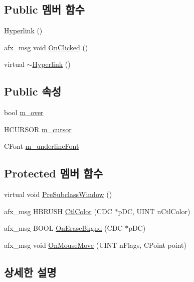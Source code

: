 \subsection*{Public 멤버 함수}
\begin{DoxyCompactItemize}
\item 
\mbox{\hyperlink{class_hyperlink_a54a241958a42b58e8fdb2d532ae16714}{Hyperlink}} ()
\item 
afx\+\_\+msg void \mbox{\hyperlink{class_hyperlink_a9fc8208b20a3f28c07bbb66aafe6fbee}{On\+Clicked}} ()
\item 
virtual \mbox{\hyperlink{class_hyperlink_ae5310ef7bff2f6f70cf08493d574cc3d}{$\sim$\+Hyperlink}} ()
\end{DoxyCompactItemize}
\subsection*{Public 속성}
\begin{DoxyCompactItemize}
\item 
bool \mbox{\hyperlink{class_hyperlink_a78f23c373fa8a3e7deb0cd9e0f8100f4}{m\+\_\+over}}
\item 
H\+C\+U\+R\+S\+OR \mbox{\hyperlink{class_hyperlink_a1caebeaeff16f7e5cf3a15718490b0c6}{m\+\_\+cursor}}
\item 
C\+Font \mbox{\hyperlink{class_hyperlink_a613980484b9ae1fbbb22d84b60fa1f33}{m\+\_\+underline\+Font}}
\end{DoxyCompactItemize}
\subsection*{Protected 멤버 함수}
\begin{DoxyCompactItemize}
\item 
virtual void \mbox{\hyperlink{class_hyperlink_a8825e770ef8eaebc598f887f8344b03a}{Pre\+Subclass\+Window}} ()
\item 
afx\+\_\+msg H\+B\+R\+U\+SH \mbox{\hyperlink{class_hyperlink_a2b38eff4e51bdefd6f2158b0c8625659}{Ctl\+Color}} (C\+DC $\ast$p\+DC, U\+I\+NT n\+Ctl\+Color)
\item 
afx\+\_\+msg B\+O\+OL \mbox{\hyperlink{class_hyperlink_a0af05ff8e84693b9bb575a814c2e46b9}{On\+Erase\+Bkgnd}} (C\+DC $\ast$p\+DC)
\item 
afx\+\_\+msg void \mbox{\hyperlink{class_hyperlink_a72fe2dbc81212528289454a7d13393c6}{On\+Mouse\+Move}} (U\+I\+NT n\+Flags, C\+Point point)
\end{DoxyCompactItemize}


\subsection{상세한 설명}


